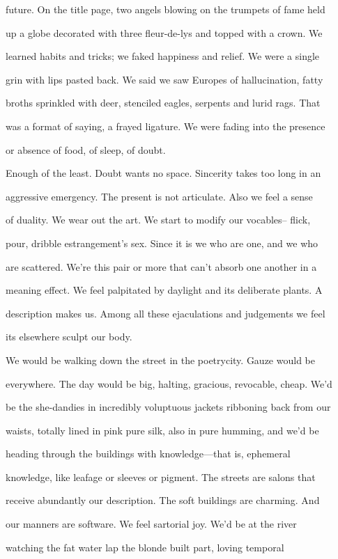 \documentclass[
]{memoir}
\begin{document}
future. On the title page, two angels blowing on the trumpets of fame
held

up a globe decorated with three fleur-de-lys and topped with a crown. We

learned habits and tricks; we faked happiness and relief. We were a
single

grin with lips pasted back. We said we saw Europes of hallucination,
fatty

broths sprinkled with deer, stenciled eagles, serpents and lurid rags.
That

was a format of saying, a frayed ligature. We were fading into the
presence

or absence of food, of sleep, of doubt.

Enough of the least. Doubt wants no space. Sincerity takes too long in
an

aggressive emergency. The present is not articulate. Also we feel a
sense

of duality. We wear out the art. We start to modify our vocables--
flick,

pour, dribble estrangement's sex. Since it is we who are one, and we who

are scattered. We're this pair or more that can't absorb one another in
a

meaning effect. We feel palpitated by daylight and its deliberate
plants. A

description makes us. Among all these ejaculations and judgements we
feel

its elsewhere sculpt our body.

We would be walking down the street in the poetrycity. Gauze would be

everywhere. The day would be big, halting, gracious, revocable, cheap.
We'd

be the she-dandies in incredibly voluptuous jackets ribboning back from
our

waists, totally lined in pink pure silk, also in pure humming, and we'd
be

heading through the buildings with knowledge---that is, ephemeral

knowledge, like leafage or sleeves or pigment. The streets are salons
that

receive abundantly our description. The soft buildings are charming. And

our manners are software. We feel sartorial joy. We'd be at the river

watching the fat water lap the blonde built part, loving temporal
\end{document}
